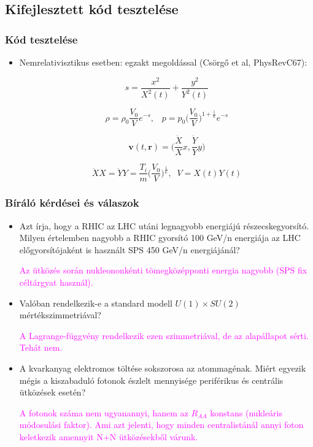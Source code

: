 \documentclass{beamer}
\begin{document}
\subsection{Kifejlesztett kód tesztelése}
\begin{frame}[noframenumbering]
\frametitle{Kód tesztelése}
\begin{itemize}
  \setlength{\itemsep}{5pt}
\item<1| only@1> Nemrelativisztikus esetben: egzakt megoldással (Csörgő et al, PhysRevC67):

\begin{equation*}
s=\frac{x^2}{X^2(t)}+\frac{y^2}{Y^2(t)}
\end{equation*}

\begin{equation*}
\rho = \rho_0\frac{V_0}{V}e^{-s},\;\;\; p=p_0\bigg(\frac{V_0}{V}\bigg)^{1+\frac{1}{\kappa}}e^{-s}
\end{equation*}

\begin{equation*}
\bm{v}(t, \bm{r})=\bigg(\frac{\dot{X}}{X}x, \frac{\dot{Y}}{Y}y\bigg)
\end{equation*}

\begin{equation*}
\ddot{X}X=\ddot{Y}Y=\frac{T_i}{m}\bigg(\frac{V_0}{V}\bigg)^{\frac{1}{\kappa}},\;\;V=X(t)Y(t)
\end{equation*}
\end{itemize}
\end{frame}

\begin{frame}[noframenumbering]
\frametitle{Bíráló kérdései és válaszok}
\begin{itemize}
\fontsize{9}{16}\selectfont
\item Azt írja, hogy a RHIC az LHC utáni legnagyobb energiájú részecskegyorsító. Milyen értelemben nagyobb a RHIC gyorsító 100 GeV/n energiája az LHC előgyorsítójaként is használt SPS 450 GeV/n energiájánál?

\textcolor{magenta}{Az ütközés során nukleononkénti tömegközépponti energia nagyobb (SPS fix céltárgyat használ).}

\item Valóban rendelkezik-e a standard modell $U(1)\times SU(2)$ mértékszimmetriával?

\textcolor{magenta}{A Lagrange-függvény rendelkezik ezen szimmetriával, de az alapállapot sérti. Tehát nem.}

\item A kvarkanyag elektromos töltése sokszorosa az atommagénak. Miért egyezik mégis a kiszabaduló fotonok észlelt mennyisége periférikus és centrális ütközések esetén?

\textcolor{magenta}{A fotonok száma nem ugyanannyi, hanem az $R_{AA}$ konstans (nukleáris módosulási faktor). Ami azt jelenti, hogy minden centralistánál annyi foton keletkezik amennyit N+N ütközésekből várunk.}

\end{itemize}
\end{frame}
\end{document}
